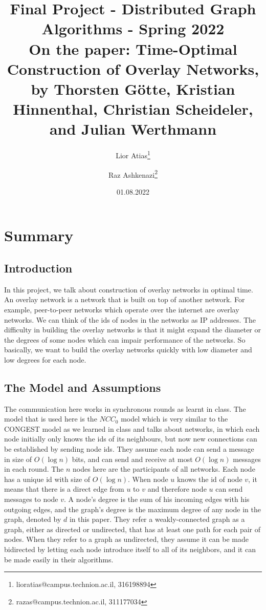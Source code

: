 \documentclass[11pt]{article}
\begin{document}
\title{Final Project - Distributed Graph Algorithms - Spring 2022\\
On the paper: Time-Optimal Construction of Overlay Networks, 
by Thorsten Götte, Kristian Hinnenthal, Christian Scheideler, and Julian Werthmann
}
\author{Lior Atias\footnote{lioratias@campus.technion.ac.il, 316198894} \and Raz Ashkenazi\footnote{razas@campus.technion.ac.il, 311177034}
}
\date{01.08.2022}
	\maketitle
\section{Summary}
\subsection{Introduction}
In this project, we talk about construction of overlay networks in optimal time. An overlay network is a network that is built on top of another network. For example, peer-to-peer networks which operate over the internet are overlay networks. We can think of the ids of nodes in the networks as IP addresses. The difficulty in building the overlay networks is that it might expand the diameter or the degrees of some nodes which can impair performance of the networks. So basically, we want to build the overlay networks quickly with low diameter and low degrees for each node.

\subsection{The Model and Assumptions}
The communication here works in synchronous rounds as learnt in class. The model that is used here is the $NCC_{0}$ model which is very similar to the CONGEST model as we learned in class and talks about networks, in which each node initially only knows the ids of its neighbours, but now new connections can be established by sending node ids. They assume each node can send a message in size of $O(\log{n})$ bits, and can send and receive at most $O(\log{n})$ messages in each round. The $n$ nodes here are the participants of all networks. Each node has a unique id with size of $O(\log{n})$. When node $u$ knows the id of node $v$, it means that there is a direct edge from $u$ to $v$ and therefore node $u$ can send messages to node $v$. A node's degree is the sum of his incoming edges with his outgoing edges, and the graph's degree is the maximum degree of any node in the graph, denoted by $d$ in this paper. They refer a weakly-connected graph as a graph, either as directed or undirected, that has at least one path for each pair of nodes. When they refer to a graph as undirected, they assume it can be made bidirected by letting each node introduce itself to all of its neighbors, and it can be made easily in their algorithms.
\end{document}
